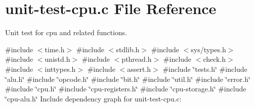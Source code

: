 \hypertarget{unit-test-cpu_8c}{}\section{unit-\/test-\/cpu.c File Reference}
\label{unit-test-cpu_8c}


Unit test for cpu and related functions.  


{\ttfamily \#include $<$time.\+h$>$}\newline
{\ttfamily \#include $<$stdlib.\+h$>$}\newline
{\ttfamily \#include $<$sys/types.\+h$>$}\newline
{\ttfamily \#include $<$unistd.\+h$>$}\newline
{\ttfamily \#include $<$pthread.\+h$>$}\newline
{\ttfamily \#include $<$check.\+h$>$}\newline
{\ttfamily \#include $<$inttypes.\+h$>$}\newline
{\ttfamily \#include $<$assert.\+h$>$}\newline
{\ttfamily \#include \char`\"{}tests.\+h\char`\"{}}\newline
{\ttfamily \#include \char`\"{}alu.\+h\char`\"{}}\newline
{\ttfamily \#include \char`\"{}opcode.\+h\char`\"{}}\newline
{\ttfamily \#include \char`\"{}bit.\+h\char`\"{}}\newline
{\ttfamily \#include \char`\"{}util.\+h\char`\"{}}\newline
{\ttfamily \#include \char`\"{}error.\+h\char`\"{}}\newline
{\ttfamily \#include \char`\"{}cpu.\+h\char`\"{}}\newline
{\ttfamily \#include \char`\"{}cpu-\/registers.\+h\char`\"{}}\newline
{\ttfamily \#include \char`\"{}cpu-\/storage.\+h\char`\"{}}\newline
{\ttfamily \#include \char`\"{}cpu-\/alu.\+h\char`\"{}}\newline
Include dependency graph for unit-\/test-\/cpu.c\+:
